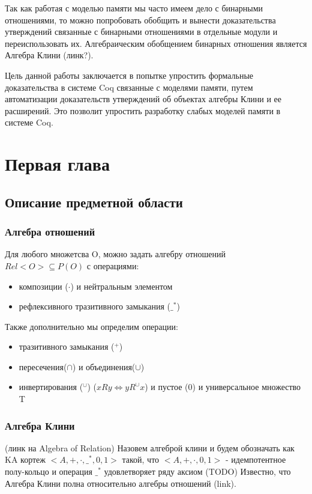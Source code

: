 \documentclass[times,specification,annotation]{itmo-student-thesis}
\begin{document}
Так как работая с моделью памяти мы часто имеем дело с бинарными отношениями, то можно попробовать обобщить и вынести доказательства утверждений связанные с бинарными отношениями в отдельные модули и переиспользовать их. Алгебраическим обобщением бинарных отношения является Алгебра Клини (линк?).

Цель данной работы заключается в попытке упростить формальные доказательства в системе Coq связанные с моделями памяти, путем автоматизации доказательств утверждений об объектах алгебры Клини и ее расширений. Это позволит упростить разработку слабых моделей памяти в системе Coq.

\chapter{Первая глава}

  \section{Описание предметной области}

    \subsection{Алгебра отношений}
      Для любого множетсва O, можно задать алгебру отношений $ Rel<O> \subseteq P(O) $ с операциями:

      \begin{itemize}
        \item композиции ($ \cdot $) и нейтральным элементом
        \item рефлексивного тразитивного замыкания ($ \_^* $)
      \end{itemize}

      Также дополнительно мы определим операции:

      \begin{itemize}
        \item тразитивного замыкания ($ ^{+} $)
        \item пересечения($ \cap $) и объединения($ \cup $)
        \item инвертирования ($ ^\cup $) ($ x R y \Leftrightarrow y R^\cup x $)
      и пустое (0) и универсальное множество T
      \end{itemize}

    \subsection{Алгебра Клини}
      (линк на Algebra of Relation)
      Назовем алгеброй клини и будем обозначать как KA кортеж $ <A, +, \cdot, \_^*, 0, 1> $ такой, что $ <A, +, \cdot, 0, 1> $ - идемпотентное полу-кольцо и операция $ \_^* $ удовлетворяет ряду аксиом (TODO)
      Известно, что Алгебра Клини полна относительно алгебры отношений (link).
\end{document}
